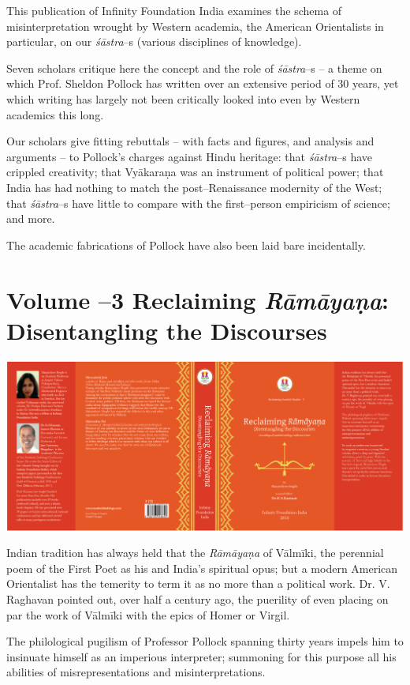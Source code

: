 This publication of Infinity Foundation India examines the schema of misinterpretation wrought by Western academia, the American Orientalists in particular, on our \textit{śāstra}–s (various disciplines of knowledge).

Seven scholars critique here the concept and the role of \textit{śāstra}–s – a theme on which Prof. Sheldon Pollock has written over an extensive period of 30 years, yet which writing has largely not been critically looked into even by Western academics this long.

Our scholars give fitting rebuttals – with facts and figures, and analysis and arguments – to Pollock's charges against Hindu heritage: that \textit{śāstra}–s have crippled creativity; that Vyākaraṇa was an instrument of political power; that India has had nothing to match the post–Renaissance modernity of the West; that \textit{śāstra}–s have little to compare with the first–person empiricism of science; and more.

The academic fabrications of Pollock have also been laid bare incidentally.


\section*{\num{Volume –3} Reclaiming \textit{Rāmāyaṇa}: Disentangling the Discourses}

\includegraphics{images/fig03.png}

Indian tradition has always held that the \textit{Rāmāyaṇa} of Vālmīki, the perennial poem of the First Poet as his and India’s spiritual opus; but a modern American Orientalist has the temerity to term it as no more than a political work. Dr. V. Raghavan pointed out, over half a century ago, the puerility of even placing on par the work of Vālmīki with the epics of Homer or Virgil.

The philological pugilism of Professor Pollock spanning thirty years impels him to insinuate himself as an imperious interpreter; summoning for this purpose all his abilities of misrepresentations and misinterpretations.

